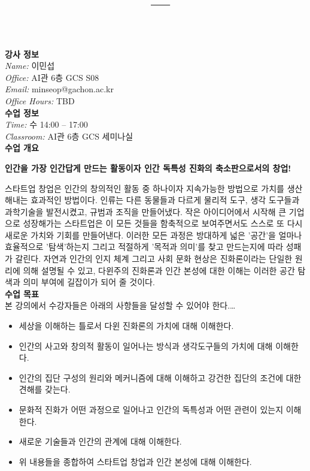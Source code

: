\documentclass[11pt,letterpaper]{article}
\title{\Large\bfseries \coursetitle \\[0.1cm] \coursesection\ --- \semester}
\author{}
\date{}
\makeatletter
\newcommand{\lefthead}[2]{\noindent\textbf{#1}\hfill\\[#2]}
\newcommand{\instructor}{이민섭}
\newcommand{\office}{AI관 6층 GCS S08}
\newcommand{\email}{minseop@gachon.ac.kr}
\newcommand{\officehours}{TBD}
\newcommand{\classtime}{수 14:00 -- 17:00}
\newcommand{\classroom}{AI관 6층 GCS 세미나실}
\makeatother
\begin{document}
\maketitle
\thispagestyle{empty}
\vspace{-2cm}


\lefthead{강사 정보}{0.3cm}
\indent \emph{Name:} \instructor \\
\indent \emph{Office:} \office \\
\indent \emph{Email:} \email \\
\indent \emph{Office Hours:} \officehours \\
[0.3cm]


\lefthead{수업 정보}{0.3cm}
\indent \emph{Time:} \classtime \\
\indent \emph{Classroom:} \classroom \\[0.3cm]


\lefthead{수업 개요}{0.3cm}
\begin{center}
	\textbf{인간을 가장 인간답게 만드는 활동이자 인간 독특성 진화의 축소판으로서의 창업!}
\end{center} 

\noindent 스타트업 창업은 인간의 창의적인 활동 중 하나이자 지속가능한 방법으로 가치를 생산해내는 효과적인 방법이다. 인류는 다른 동물들과 다르게  물리적 도구, 생각 도구들과 과학기술을 발전시켰고, 규범과 조직을 만들어냈다. 작은 아이디어에서 시작해 큰 기업으로 성장해가는 스타트업은 이 모든 것들을 함축적으로 보여주면서도 스스로 또 다시 새로운 가치와 기회를 만들어낸다. 이러한 모든 과정은 방대하게 넓은 '공간'을 얼마나 효율적으로 '탐색'하는지 그리고 적절하게 '목적과 의미'를 찾고 만드는지에 따라 성패가 갈린다. 자연과 인간의 인지 체계 그리고 사회 문화 현상은 진화론이라는 단일한 원리에 의해 설명될 수 있고, 다윈주의 진화론과 인간 본성에 대한 이해는 이러한 공간 탐색과 의미 부여에 길잡이가 되어 줄 것이다.   \\[0.3cm]



\lefthead{수업 목표}{0.3cm}
본 강의에서 수강자들은 아래의 사항들을 달성할 수 있어야 한다.\dots
        \begin{itemize}
        \item 세상을 이해하는 틀로서 다윈 진화론의 가치에 대해 이해한다. 
        \item 인간의 사고와 창의적 활동이 일어나는 방식과 생각도구들의 가치에 대해 이해한다.
        \item 인간의 집단 구성의 원리와 메커니즘에 대해 이해하고 강건한 집단의 조건에 대한 견해를 갖는다.
        \item 문화적 진화가 어떤 과정으로 일어나고 인간의 독특성과 어떤 관련이 있는지 이해한다.
        \item 새로운 기술들과 인간의 관계에 대해 이해한다.
        \item 위 내용들을 종합하여 스타트업 창업과 인간 본성에 대해 이해한다.
        \end{itemize} \vspace{0.3cm}
\end{document}
